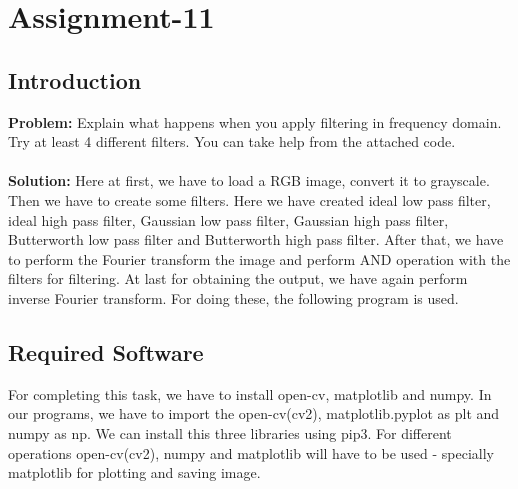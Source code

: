 \documentclass{article}
\begin{document}
{
    \section{Assignment-11}
    \subsection{Introduction}
    \textbf {Problem: }
    Explain what happens when you apply filtering in frequency domain. Try at least 4 different filters. You can take help from the attached code.\\
    \\
    \textbf{Solution: }
    Here at first, we have to load a RGB image, convert it to grayscale. Then we have to create some filters. Here we have created ideal low pass filter, ideal high pass filter, Gaussian low pass filter, Gaussian high pass filter, Butterworth low pass filter and Butterworth high pass filter. After that, we have to perform the Fourier transform the image and perform AND operation with the filters for filtering. At last for obtaining the output, we have again perform inverse Fourier transform. For doing these, the following program is used.
    \\
    
    \subsection{Required Software}
    For completing this task, we have to install open-cv, matplotlib and numpy. In our programs, we have to import the open-cv(cv2), matplotlib.pyplot as plt and numpy as np. We can install this three libraries using pip3. For different operations open-cv(cv2), numpy and matplotlib will have to be used - specially matplotlib for plotting and saving image. 
    \\
    
}
\end{document}

